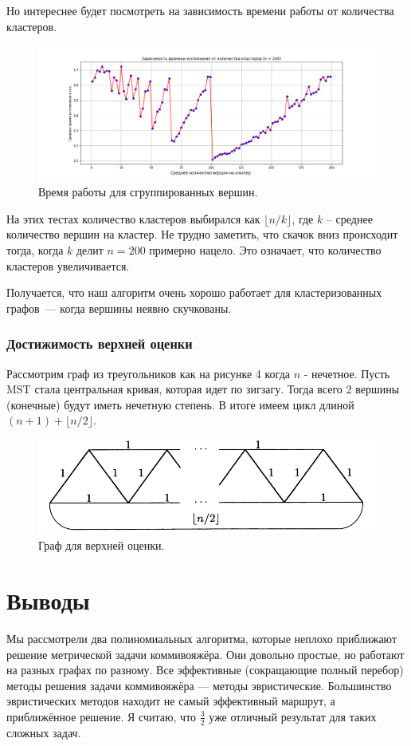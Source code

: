 \documentclass[a4paper,12pt]{article}
\theoremstyle{plain}
\theoremstyle{definition}
\theoremstyle{remark}
\begin{document}
Но интереснее будет посмотреть на зависимость времени работы от количества кластеров.

\begin{figure}[h!]
    \includegraphics[width=18cm]{img/graph_gauss.png}
    \centering
    \caption{Время работы для сгруппированных вершин.}
\end{figure}

На этих тестах количество кластеров выбирался как $\lfloor n / k \rfloor$, где $k$ -- среднее количество вершин на кластер. Не трудно заметить, что скачок вниз происходит тогда, когда $k$ делит $n = 200$ примерно нацело. Это означает, что количество кластеров увеличивается.


Получается, что наш алгоритм очень хорошо работает для кластеризованных графов~--- когда вершины неявно скучкованы.

\subsubsection{Достижимость верхней оценки}

Рассмотрим граф из треугольников как на рисунке 4 когда $n$ - нечетное. Пусть \textsf{MST} стала центральная кривая, которая идет по зигзагу. Тогда всего 2 вершины (конечные) будут иметь нечетную степень. В итоге имеем цикл длиной $(n + 1) + \lfloor n / 2 \rfloor$.
\begin{figure}[h!]
    \centering
    \includegraphics[width=17cm]{img/sample.jpg.png}
    \caption{Граф для верхней оценки.}
\end{figure}


\section{Выводы}
Мы рассмотрели два полиномиальных алгоритма, которые неплохо приближают решение метрической задачи коммивояжёра. Они довольно простые, но работают на разных графах по разному. Все эффективные (сокращающие полный перебор) методы решения задачи коммивояжёра — методы эвристические. Большинство эвристических методов находит не самый эффективный маршрут, а приближённое решение. Я считаю, что $\frac{3}{2}$ уже отличный результат для таких сложных задач.
\end{document}
